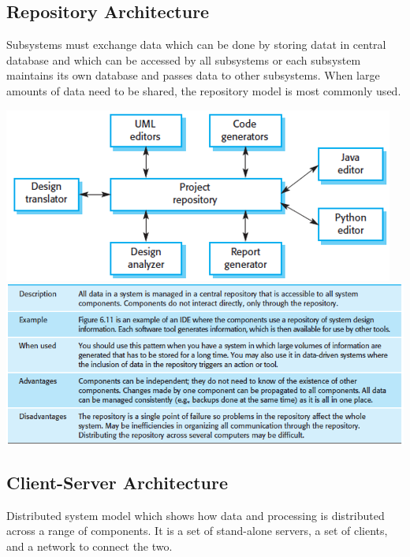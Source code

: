 \documentclass{article}
\begin{document}
    \subsection*{Repository Architecture}

    Subsystems must exchange data which can be done by storing datat in central database
    and which can be accessed by all subsystems or each subsystem maintains its own 
    database and passes data to other subsystems. When large amounts of data need to be 
    shared, the repository model is most commonly used.

    \begin{center}
        \includegraphics[scale=0.7]{repository_architecture.png}
        \includegraphics[scale=0.7]{repository_architecture-desc.png}
    \end{center}

    \subsection*{Client-Server Architecture}

    Distributed system model which shows how data and processing is distributed across 
    a range of components. It is a set of stand-alone servers, a set of clients, and a 
    network to connect the two.
\end{document}
